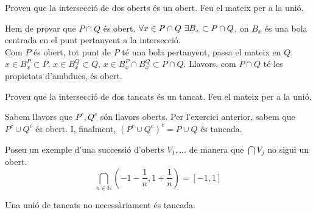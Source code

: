 \documentclass[../main.tex]{subfiles}
\begin{document}
    \begin{exercici}[5 de la llista 1]
        Proveu que la intersecció de dos oberts és un obert. Feu el mateix per a la unió.
        \begin{center}
        \end{center}
        Hem de provar que $P\cap Q$ és obert. $\forall x \in P\cap Q \hbox{ }\exists B_x \subset P\cap Q$,
        on $B_x$ és una bola centrada en el punt pertanyent a la intersecció.\\
        Com $P$ és obert, tot punt de $P$ té una bola pertanyent, passa el mateix en $Q$.\\
        $x \in B_x^P \subset P$, $x \in B_x^Q \subset Q$, $x \in B_x^P \cap B_x^Q \subset P\cap Q$.
        Llavors, com $P\cap Q$ té les propietats d'ambdues, és obert.
    \end{exercici}
    \begin{exercici}[6 de la llista 1]
        Proveu que la intersecció de dos tancats és un tancat. Feu el mateix per a la unió.
        \begin{center}
        \end{center}
        Sabem llavors que $P^c, Q^c$ són llavors oberts. Per l'exercici anterior, sabem que $P^c\cup Q^c$
        és obert. I, finalment, $\left(P^c\cup Q^c\right)^c = P\cup Q$ és tancada. 
    \end{exercici}
    \begin{exercici}[7 de la llista 1] Poseu un exemple d'una successió d'oberts $V_1, \dots$ de manera que $\bigcap V_j$ no sigui un obert.
        \begin{displaymath}
            \bigcap\limits_{n \in \mathbb{N}} \left(-1-\frac{1}{n}, 1+\frac{1}{n}\right) = [-1, 1]
        \end{displaymath}
        \begin{obs}
            Una unió de tancats no necessàriament és tancada.
        \end{obs}
    \end{exercici}
\end{document}
